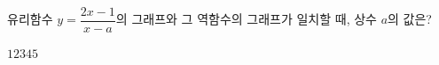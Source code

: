 \hspace*{2mm}\begin{minipage}[t]{\dimexpr\linewidth-2mm\relax}\vspace{0pt}
유리함수 $y=\dfrac{2x-1}{x-a}$의 그래프와 그 역함수의 그래프가 일치할 때, 상수 $a$의 값은?
\begin{choices32}{$1$}{$2$}{$3$}{$4$}{$5$}\end{choices32}\end{minipage}
